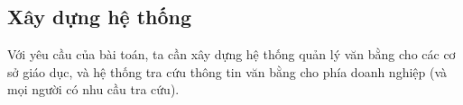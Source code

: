 \subsection{Xây dựng hệ thống}

Với yêu cầu của bài toán, ta cần xây dựng hệ thống quản lý văn bằng cho các cơ sở giáo dục, và hệ thống tra cứu thông tin văn bằng cho phía doanh nghiệp (và mọi người có nhu cầu tra cứu).\\

